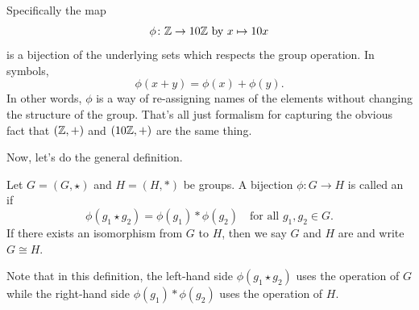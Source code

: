 Specifically the map
\[ \phi \colon \mathbb Z \to 10 \mathbb Z  \text{ by } x \mapsto 10 x \]
is a bijection of the underlying sets which respects the group operation.
In symbols,
\[ \phi(x + y) = \phi(x) + \phi(y). \]
In other words, $\phi$ is a way of re-assigning names of the elements
without changing the structure of the group.
That's all just formalism for
capturing the obvious fact that $(\mathbb Z,+)$
and $(10 \mathbb Z, +)$ are the same thing.

Now, let's do the general definition.
\begin{definition}
	Let $G = (G, \star)$ and $H = (H, \ast)$ be groups.
	A bijection $\phi \colon G \to H$ is called an  if
	\[ \phi(g_1 \star g_2) = \phi(g_1) \ast \phi(g_2) \quad
		\text{for all $g_1, g_2 \in G$}. \]
	If there exists an isomorphism from $G$ to $H$,
	then we say $G$ and $H$ are  and write $G \cong H$.
\end{definition}
Note that in this definition, the left-hand side
$\phi(g_1 \star g_2)$ uses the operation of $G$
while the right-hand side $\phi(g_1) \ast \phi(g_2)$
uses the operation of $H$.

